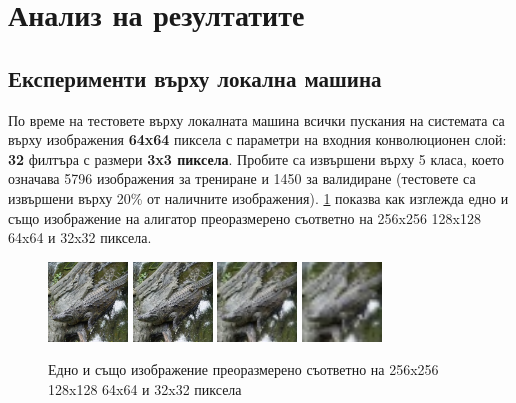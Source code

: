 \section{Анализ на резултатите}

\subsection{Експерименти върху локална машина}

По време на тестовете върху локалната машина всички пускания на системата са върху изображения \textbf{64x64} пиксела с параметри на входния конволюционен слой: \textbf{32} филтъра с размери \textbf{3x3 пиксела}. Пробите са извършени върху 5 класа, което означава 5796 изображения за трениране и 1450 за валидиране (тестовете са извършени върху 20\% от наличните изображения). \ref{fig:example_sizes} показва как изглежда едно и също изображение на алигатор преоразмерено съответно на 256x256 128x128 64x64 и 32x32 пиксела.

\begin{figure}[H]
\centering
\includegraphics[width=80px,height=80px]{Figures/256.JPEG}
\includegraphics[width=80px,height=80px]{Figures/128.JPEG}
\includegraphics[width=80px,height=80px]{Figures/64.JPEG}
\includegraphics[width=80px,height=80px]{Figures/32.JPEG}
\caption{Едно и също изображение преоразмерено съответно на 256x256 128x128 64x64 и 32x32 пиксела}
\label{fig:example_sizes}
\end{figure}

